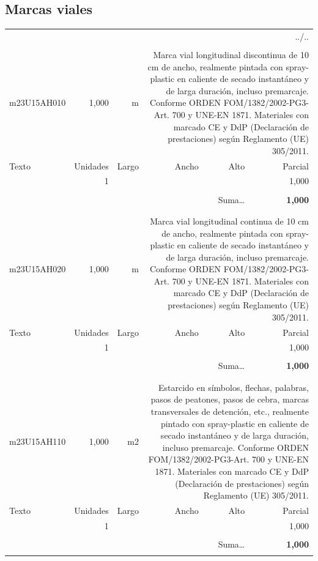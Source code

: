 \documentclass{book}%
\begin{document}
%
\subsection{Marcas viales}%
\begin{longtable}{lrrrrr}%
\multicolumn{6}{r}{../..}\\%
\endfoot%
\endlastfoot%
&&&&&\\%
m23U15AH010&     1,000& m&\multicolumn{3}{p{6cm}}{\scriptsize Marca vial longitudinal discontinua de 10 cm de ancho, realmente pintada con spray-plastic en caliente de secado instantáneo y de larga duración, incluso premarcaje. Conforme ORDEN FOM/1382/2002-PG3-Art. 700 y UNE-EN 1871. Materiales con marcado CE y DdP (Declaración de prestaciones) según Reglamento (UE) 305/2011.\normalsize}\\%
Texto&Unidades&Largo&Ancho&Alto&Parcial\\%
\hline%
\multicolumn{1}{p{3.5cm}}{ }&1&&&&     1,000\\%
&&&&&\\%
\multicolumn{5}{r}{Suma\ldots}&\textbf{     1,000}\\%
\hline%
&&&&&\\%
&&&&&\\%
m23U15AH020&     1,000& m&\multicolumn{3}{p{6cm}}{\scriptsize Marca vial longitudinal continua de 10 cm de ancho, realmente pintada con spray-plastic en caliente de secado instantáneo y de larga duración, incluso premarcaje. Conforme ORDEN FOM/1382/2002-PG3-Art. 700 y UNE-EN 1871. Materiales con marcado CE y DdP (Declaración de prestaciones) según Reglamento (UE) 305/2011.\normalsize}\\%
Texto&Unidades&Largo&Ancho&Alto&Parcial\\%
\hline%
\multicolumn{1}{p{3.5cm}}{ }&1&&&&     1,000\\%
&&&&&\\%
\multicolumn{5}{r}{Suma\ldots}&\textbf{     1,000}\\%
\hline%
&&&&&\\%
&&&&&\\%
m23U15AH110&     1,000& m2&\multicolumn{3}{p{6cm}}{\scriptsize Estarcido en símbolos, flechas, palabras, pasos de peatones, pasos de cebra, marcas transversales de detención, etc., realmente pintado con spray-plastic en caliente de secado instantáneo y de larga duración, incluso premarcaje. Conforme ORDEN FOM/1382/2002-PG3-Art. 700 y UNE-EN 1871. Materiales con marcado CE y DdP (Declaración de prestaciones) según Reglamento (UE) 305/2011.\normalsize}\\%
Texto&Unidades&Largo&Ancho&Alto&Parcial\\%
\hline%
\multicolumn{1}{p{3.5cm}}{ }&1&&&&     1,000\\%
&&&&&\\%
\multicolumn{5}{r}{Suma\ldots}&\textbf{     1,000}\\%
\hline%
&&&&&\\%
\end{longtable}%
\newpage
\end{document}

